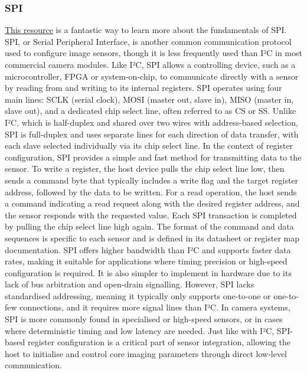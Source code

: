 \subsubsection{SPI}
\href{https://www.youtube.com/watch?v=0nVNwozXsIc}{This resource} is a fantastic way to learn more about the fundamentals of SPI.
\nl
SPI, or Serial Peripheral Interface, is another common communication protocol used to configure image sensors, though it is less frequently used than I²C in most commercial camera modules. Like I²C, SPI allows a controlling device, such as a microcontroller, FPGA or system-on-chip, to communicate directly with a sensor by reading from and writing to its internal registers.
SPI operates using four main lines: SCLK (serial clock), MOSI (master out, slave in), MISO (master in, slave out), and a dedicated chip select line, often referred to as CS or SS.
Unlike I²C, which is half-duplex and shared over two wires with address-based selection, SPI is full-duplex and uses separate lines for each direction of data transfer, with each slave selected individually via its chip select line.
\nl
In the context of register configuration, SPI provides a simple and fast method for transmitting data to the sensor. To write a register, the host device pulls the chip select line low, then sends a command byte that typically includes a write flag and the target register address, followed by the data to be written.
For a read operation, the host sends a command indicating a read request along with the desired register address, and the sensor responds with the requested value.
Each SPI transaction is completed by pulling the chip select line high again. The format of the command and data sequences is specific to each sensor and is defined in its datasheet or register map documentation.
\nl
SPI offers higher bandwidth than I²C and supports faster data rates, making it suitable for applications where timing precision or high-speed configuration is required. It is also simpler to implement in hardware due to its lack of bus arbitration and open-drain signalling.
However, SPI lacks standardised addressing, meaning it typically only supports one-to-one or one-to-few connections, and it requires more signal lines than I²C.
In camera systems, SPI is more commonly found in specialised or high-speed sensors, or in cases where deterministic timing and low latency are needed. Just like with I²C, SPI-based register configuration is a critical part of sensor integration, allowing the host to initialise and control core imaging parameters through direct low-level communication.

